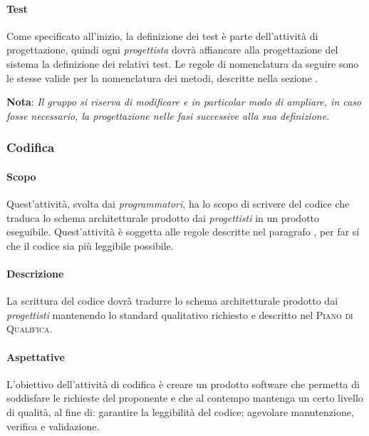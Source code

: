 \paragraph{Test}

Come specificato all'inizio, la definizione dei test è parte dell'attività di progettazione, quindi ogni 
\emph{progettista} dovrà affiancare alla progettazione del sistema la definizione dei relativi test. Le regole di 
nomenclatura da seguire sono le stesse valide per la nomenclatura dei metodi, descritte nella sezione 
.

\begin{center}
    \textbf{Nota}: \emph{Il gruppo si riserva di modificare e in particolar modo di ampliare, in caso fosse 
    necessario, la progettazione nelle fasi successive alla sua definizione.}
\end{center}

\subsubsection{Codifica}
 
\paragraph{Scopo}

Quest'attività, svolta dai \emph{programmatori}, ha lo scopo di scrivere del codice che traduca lo schema architetturale 
prodotto dai \emph{progettisti} in un prodotto eseguibile. Quest'attività è soggetta alle regole descritte nel paragrafo 
, per far sí che il codice sia più leggibile possibile.

\paragraph{Descrizione}

La scrittura del codice dovrà tradurre lo schema architetturale prodotto dai \emph{progettisti} mantenendo lo standard 
qualitativo richiesto e descritto nel \textsc{Piano di Qualifica}.

\paragraph{Aspettative}

L'obiettivo dell'attività di codifica è creare un prodotto software che permetta di soddisfare le richieste del 
proponente e che al contempo mantenga un certo livello di qualità, al fine di: garantire la leggibilità del codice; agevolare manutenzione, verifica e validazione.

